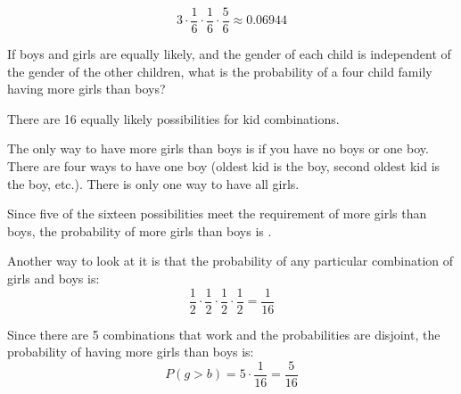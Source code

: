 \documentclass[landscape]{exam}
\begin{document}
\begin{questions}
\begin{parts}
\begin{solution}
          \[
            3 \cdot \frac{1}{6} \cdot \frac{1}{6} \cdot \frac{5}{6} 
                \approx \boxed{ 0.06944 }
          \]
        \end{solution}
      \end{parts}



    \question[8] If boys and girls are equally likely, and the gender of each
    child is independent of the gender of the other children, what is the probability
    of a four child family having more girls than boys?

    \begin{solution}
      There are 16 equally likely possibilities for kid combinations. 
      
      The only way to have more girls than boys is if you have no boys or one
      boy. There are four ways to have one boy (oldest kid is the boy, second
      oldest kid is the boy, etc.). There is only one way to have all girls.

      Since five of the sixteen possibilities meet the requirement of more girls
      than boys, the probability of more girls than boys is .

      Another way to look at it is that the probability of any particular
      combination of girls and boys is:
      \[
        \frac{1}{2} \cdot \frac{1}{2} \cdot \frac{1}{2} \cdot \frac{1}{2} = \frac{1}{16}
      \]

      Since there are 5 combinations that work and the probabilities are
      disjoint, the probability of having more girls than boys is:
      \[
        P(g > b) = 5 \cdot \frac{1}{16} = \boxed{ \frac{5}{16} }
      \]

    \end{solution}


\end{questions}
\end{document}
